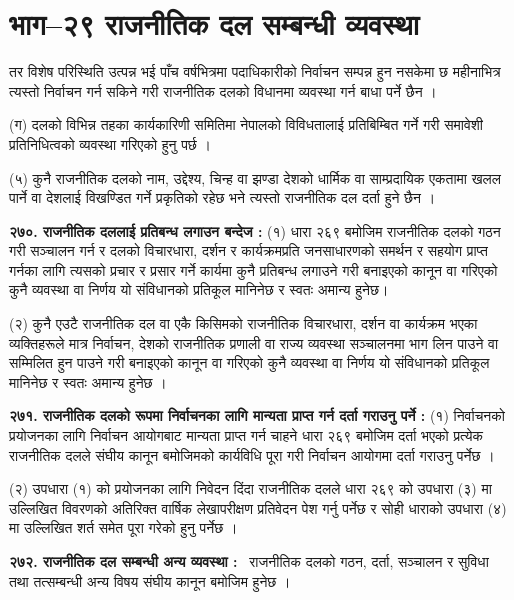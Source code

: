 \section{भाग–२९ राजनीतिक दल सम्बन्धी व्यवस्था}

तर विशेष परिस्थिति उत्पन्न भई पाँच वर्षभित्रमा पदाधिकारीको निर्वाचन सम्पन्न हुन नसकेमा छ महीनाभित्र त्यस्तो निर्वाचन गर्न सकिने गरी राजनीतिक दलको विधानमा व्यवस्था गर्न बाधा पर्ने छैन ।

(ग) दलको विभिन्न तहका कार्यकारिणी समितिमा नेपालको विविधतालाई प्रतिबिम्बित गर्ने गरी समावेशी प्रतिनिधित्वको व्यवस्था गरिएको हुनु पर्छ ।

(५) कुनै राजनीतिक दलको नाम, उद्देश्य, चिन्ह वा झण्डा देशको धार्मिक वा साम्प्रदायिक एकतामा खलल पार्ने वा देशलाई विखण्डित गर्ने प्रकृतिको रहेछ भने त्यस्तो राजनीतिक दल दर्ता हुने छैन ।

\textbf{२७०. राजनीतिक दललाई प्रतिबन्ध लगाउन बन्देज :} (१) धारा २६९ बमोजिम राजनीतिक दलको गठन गरी सञ्चालन गर्न र दलको विचारधारा, दर्शन र कार्यक्रमप्रति जनसाधारणको समर्थन र सहयोग प्राप्त गर्नका लागि त्यसको प्रचार र प्रसार गर्ने कार्यमा कुनै प्रतिबन्ध लगाउने गरी बनाइएको कानून वा गरिएको कुनै व्यवस्था वा निर्णय यो संविधानको प्रतिकूल मानिनेछ र स्वतः अमान्य हुनेछ।

(२) कुनै एउटै राजनीतिक दल वा एकै किसिमको राजनीतिक विचारधारा, दर्शन वा कार्यक्रम भएका व्यक्तिहरूले मात्र निर्वाचन, देशको राजनीतिक प्रणाली वा राज्य व्यवस्था सञ्चालनमा भाग लिन पाउने वा सम्मिलित हुन पाउने गरी बनाइएको कानून वा गरिएको कुनै व्यवस्था वा निर्णय यो संविधानको प्रतिकूल मानिनेछ र स्वतः अमान्य हुनेछ ।

\textbf{२७१. राजनीतिक दलको रूपमा निर्वाचनका लागि मान्यता प्राप्त गर्न दर्ता गराउनु पर्ने :} (१) निर्वाचनको प्रयोजनका लागि निर्वाचन आयोगबाट मान्यता प्राप्त गर्न चाहने धारा २६९ बमोजिम दर्ता भएको प्रत्येक राजनीतिक दलले संघीय कानून बमोजिमको कार्यविधि पूरा गरी निर्वाचन आयोगमा दर्ता गराउनु पर्नेछ ।

(२) उपधारा (१) को प्रयोजनका लागि निवेदन दिंदा राजनीतिक दलले धारा २६९ को उपधारा (३) मा उल्लिखित विवरणको अतिरिक्त वार्षिक लेखापरीक्षण प्रतिवेदन पेश गर्नु पर्नेछ र सोही धाराको उपधारा (४) मा उल्लिखित शर्त समेत पूरा गरेको हुनु पर्नेछ ।

\textbf{२७२. राजनीतिक दल सम्बन्धी अन्य व्यवस्था :}  राजनीतिक दलको गठन, दर्ता, सञ्चालन र सुविधा तथा तत्सम्बन्धी अन्य विषय संघीय कानून बमोजिम हुनेछ ।
